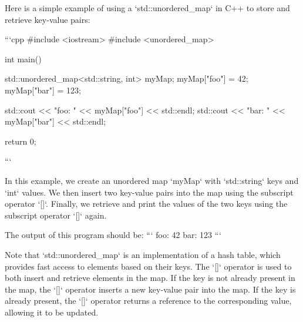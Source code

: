 Here is a simple example of using a `std::unordered_map` in C++ to store and retrieve key-value pairs:

```cpp
#include <iostream>
#include <unordered_map>

int main() {
    std::unordered_map<std::string, int> myMap;
    myMap["foo"] = 42;
    myMap["bar"] = 123;

    std::cout << "foo: " << myMap["foo"] << std::endl;
    std::cout << "bar: " << myMap["bar"] << std::endl;

    return 0;
}
```

In this example, we create an unordered map `myMap` with `std::string` keys and `int` values. We then insert two key-value pairs into the map using the subscript operator `[]`. Finally, we retrieve and print the values of the two keys using the subscript operator `[]` again.

The output of this program should be:
```
foo: 42
bar: 123
```

Note that `std::unordered_map` is an implementation of a hash table, which provides fast access to elements based on their keys. The `[]` operator is used to both insert and retrieve elements in the map. If the key is not already present in the map, the `[]` operator inserts a new key-value pair into the map. If the key is already present, the `[]` operator returns a reference to the corresponding value, allowing it to be updated.
